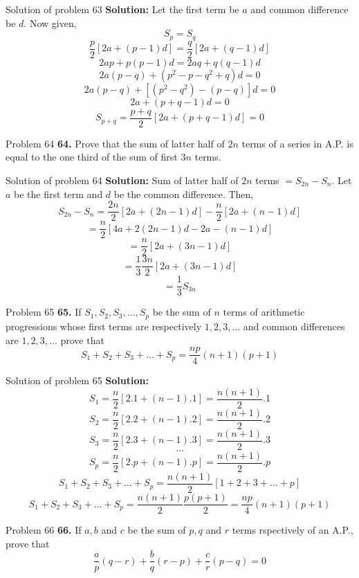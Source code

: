 \documentclass[aspectratio=1610,8pt]{beamer}
\begin{document}
\begin{frame}{Solution of problem 63}
  \textbf{Solution:} Let the first term be $a$ and common difference be $d$. Now
  given,
  $$S_p = S_q$$
  $$\frac{p}{2}[2a + (p - 1)d] = \frac{q}{2}[2a + (q - 1)d]$$
  $$2ap + p(p - 1)d = 2aq + q(q - 1)d$$
  $$2a(p - q) + (p^2 - p -q^2 + q)d = 0$$
  $$2a(p - q) + [(p^2 - q^2) -(p - q)]d = 0$$
  $$2a + (p + q - 1)d = 0$$
  $$S_{p + q} = \frac{p +q}{2}[2a + (p + q - 1)d] = 0$$
\end{frame}
\begin{frame}{Problem 64}
  \textbf{64.} Prove that the sum of latter half of $2n$ terms of a series in
  A.P. is equal to the one third of the sum of first $3n$ terms.
\end{frame}
\begin{frame}{Solution of problem 64}
  \textbf{Solution:} Sum of latter half of $2n$ terms $= S_{2n} - S_n.$ Let $a$
  be the first term and $d$ be the common difference. Then,
  $$S_{2n} - S_n = \frac{2n}{2}[2a + (2n - 1)d] - \frac{n}{2}[2a + (n - 1)d]$$
  $$= \frac{n}{2}[4a +2(2n - 1)d - 2a -(n - 1)d]$$
  $$= \frac{n}{2}[2a + (3n - 1)d]$$
  $$=\frac{1}{3}\frac{3n}{2}[2a + (3n - 1)d]$$
  $$= \frac{1}{3}S_{3n}$$
\end{frame}
\begin{frame}{Problem 65}
  \textbf{65.} If $S_1, S_2, S_3, \ldots, S_p$ be the sum of $n$ terms of
  arithmetic progressions whose first terms are respectively $1, 2, 3, \ldots$
  and common differences are $1, 2, 3, \ldots$ prove that
  $$S_1 + S_2 + S_3 + \ldots + S_p = \frac{np}{4}(n+1)(p+1)$$
\end{frame}
\begin{frame}{Solution of problem 65}
  \textbf{Solution:}
  $$S_1 = \frac{n}{2}[2.1 + (n - 1).1] = \frac{n(n + 1)}{2}.1$$
  $$S_2 = \frac{n}{2}[2.2 + (n - 1).2] = \frac{n(n + 1)}{2}.2$$
  $$S_3 = \frac{n}{2}[2.3 + (n - 1).3] = \frac{n(n + 1)}{2}.3$$
  $$\ldots$$
  $$S_p = \frac{n}{2}[2.p + (n - 1).p] = \frac{n(n+1)}{2}.p$$
  $$S_1 + S_2 + S_3 + \ldots + S_p = \frac{n(n + 1)}{2}[1 + 2 + 3 + \ldots +
    p]$$
  $$S_1 + S_2 + S_3 + \ldots + S_p = \frac{n(n + 1)}{2}\frac{p(p + 1)}{2} =
  \frac{np}{4}(n + 1)(p + 1)$$
\end{frame}
\begin{frame}{Problem 66}
  \textbf{66.} If $a,b$ and $c$ be the sum of $p, q$ and $r$ terms rspectively
  of an A.P., prove that
  $$\frac{a}{p}(q - r) + \frac{b}{q}(r - p) + \frac{c}{r}(p - q) = 0$$
\end{frame}
\end{document}
